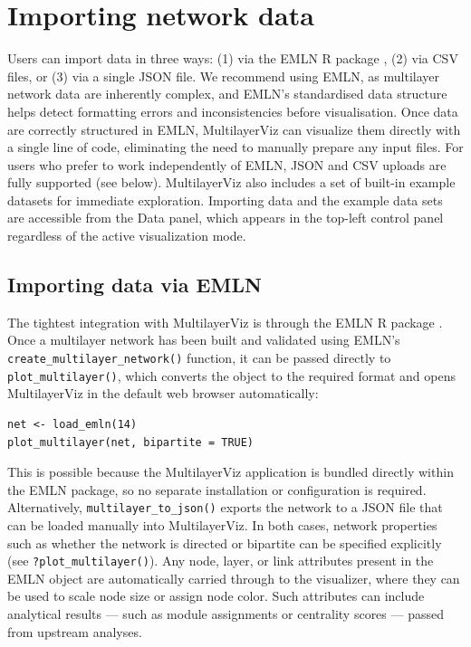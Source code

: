 \documentclass{article}
\begin{document}
\section{Importing network data}

Users can import data in three ways: (1) via the EMLN R package \cite{Frydman2023-qe}, (2) via CSV files, or (3) via a single JSON file. We recommend using EMLN, as multilayer network data are inherently complex, and EMLN's standardised data structure helps detect formatting errors and inconsistencies before visualisation. Once data are correctly structured in EMLN, MultilayerViz can visualize them directly with a single line of code, eliminating the need to manually prepare any input files. For users who prefer to work independently of EMLN, JSON and CSV uploads are fully supported (see below). MultilayerViz also includes a set of built-in example datasets for immediate exploration. Importing data and the example data sets are accessible from the Data panel, which appears in the top-left control panel regardless of the active visualization mode.

\subsection{Importing data via EMLN}
The tightest integration with MultilayerViz is through the EMLN R package \cite{Frydman2023-qe}. Once a multilayer network has been built and validated using EMLN's \texttt{create_multilayer_network()} function, it can be passed directly to \texttt{plot_multilayer()}, which converts the object to the required format and opens MultilayerViz in the default web browser automatically:

\begin{verbatim}
net <- load_emln(14)
plot_multilayer(net, bipartite = TRUE)
\end{verbatim}

This is possible because the MultilayerViz application is bundled directly within the EMLN package, so no separate installation or configuration is required. Alternatively, \texttt{multilayer_to_json()} exports the network to a JSON file that can be loaded manually into MultilayerViz. In both cases, network properties such as whether the network is directed or bipartite can be specified explicitly (see \texttt{?plot_multilayer()}). Any node, layer, or link attributes present in the EMLN object are automatically carried through to the visualizer, where they can be used to scale node size or assign node color. Such attributes can include analytical results — such as module assignments or centrality scores — passed from upstream analyses.
\end{document}
